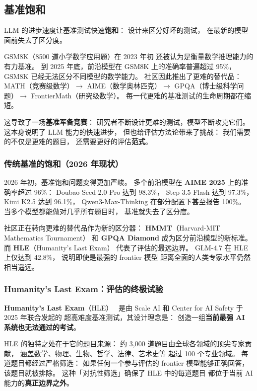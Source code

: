 \subsection{基准饱和}

LLM 的进步速度让基准测试快速\textbf{饱和}：
设计来区分好坏的测试，
在最新的模型面前失去了区分度。

GSM8K（8500 道小学数学应用题）在 2023 年初
还被认为是衡量数学推理能力的有力基准。
到 2025 年底，前沿模型在 GSM8K 上的准确率普遍超过 95\%，
GSM8K 已经无法区分不同模型的数学能力。
社区因此推出了更难的替代品：
MATH（竞赛级数学）$\to$ AIME（数学奥林匹克）$\to$
GPQA（博士级科学问题）$\to$ FrontierMath（研究级数学）。
每一代更难的基准测试的生命周期都在缩短。

这导致了一场\textbf{基准军备竞赛}：
研究者不断设计更难的测试，模型不断攻克它们。
这本身说明了 LLM 能力的快速进步，
但也给评估方法论带来了挑战：
我们需要的不仅是更难的题目，
还需要更好的评估\textbf{范式}。

\subsubsection{传统基准的饱和（2026 年现状）}

2026 年初，基准饱和问题变得更加严峻。
多个前沿模型在 \textbf{AIME 2025} 上的准确率超过 96\%：
Doubao Seed 2.0 Pro 达到 98.3\%，
Step 3.5 Flash 达到 97.3\%，
Kimi K2.5 达到 96.1\%，
Qwen3-Max-Thinking 在部分配置下甚至报告 100\%。
当多个模型都能做对几乎所有题目时，
基准就失去了区分度。

社区正在转向更难的替代品作为新的区分器：
\textbf{HMMT}（Harvard-MIT Mathematics Tournament）
和 \textbf{GPQA Diamond} 成为区分前沿模型的新标准。
而 \textbf{HLE}（Humanity's Last Exam）
代表了评估的最远边界。
GLM-4.7 在 HLE 上仅达到 42.8\%，
说明即使是最强的 frontier 模型
距离全面的人类专家水平仍然相当遥远。

\subsubsection{Humanity's Last Exam：评估的终极试验}

\textbf{Humanity's Last Exam}（HLE）~\cite{phan2025hle}
是由 Scale AI 和 Center for AI Safety 于 2025 年联合发起的
超高难度基准测试，其设计理念是：
创造一组\textbf{当前最强 AI 系统也无法通过的考试}。

HLE 的独特之处在于它的题目来源：
约 3,000 道题目由全球各领域的顶尖专家贡献，
涵盖数学、物理、生物、哲学、法律、艺术史等
超过 100 个专业领域。
每道题目都经过严格筛选：
如果任何一个参与评估的 frontier 模型能够正确回答，
该题目就被排除。
这种「对抗性筛选」确保了 HLE 中的每道题目
都位于当前 AI 能力的\textbf{真正边界之外}。

